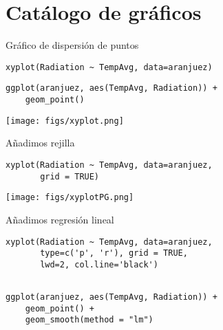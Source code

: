 \documentclass[aspectratio=169, usenames,svgnames,dvipsnames]{beamer}
\begin{document}
\section{Catálogo de gráficos}
\label{sec:orgcb2f11e}

\begin{frame}[label={sec:orge4ea54a},fragile]{Gráfico de dispersión de puntos}
 \lstset{language=r,label= ,caption= ,captionpos=b,numbers=none}
\begin{lstlisting}
xyplot(Radiation ~ TempAvg, data=aranjuez)
\end{lstlisting}

\lstset{language=r,label= ,caption= ,captionpos=b,numbers=none}
\begin{lstlisting}
ggplot(aranjuez, aes(TempAvg, Radiation)) + 
    geom_point()
\end{lstlisting}
\end{frame}

\begin{frame}[label={sec:orgc4c95b7}]{}
\begin{center}
\texttt{[image: figs/xyplot.png]}
\end{center}
\end{frame}

\begin{frame}[label={sec:org7fd3482},fragile]{Añadimos rejilla}
 \lstset{language=r,label= ,caption= ,captionpos=b,numbers=none}
\begin{lstlisting}
xyplot(Radiation ~ TempAvg, data=aranjuez,
       grid = TRUE)
\end{lstlisting}
\end{frame}

\begin{frame}[label={sec:org18aef03}]{}
\begin{center}
\texttt{[image: figs/xyplotPG.png]}
\end{center}
\end{frame}


\begin{frame}[label={sec:orgd69e362},fragile]{Añadimos regresión lineal}
 \lstset{language=r,label= ,caption= ,captionpos=b,numbers=none}
\begin{lstlisting}
xyplot(Radiation ~ TempAvg, data=aranjuez,
       type=c('p', 'r'), grid = TRUE,
       lwd=2, col.line='black')
  
\end{lstlisting}

\lstset{language=r,label= ,caption= ,captionpos=b,numbers=none}
\begin{lstlisting}
ggplot(aranjuez, aes(TempAvg, Radiation)) + 
    geom_point() +
    geom_smooth(method = "lm")
\end{lstlisting}
\end{frame}
\end{document}
